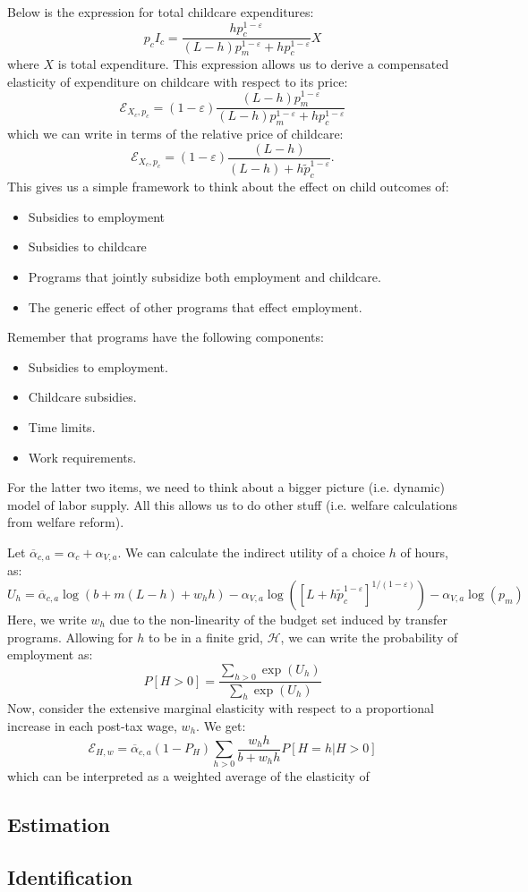 \documentclass[12pt]{article}
\newcommand\ov{\overline}
\newcommand\mc{\mathcal}
\numberwithin{equation}{section}
\numberwithin{figure}{section}
\numberwithin{table}{section}
\begin{document}
Below is the expression for total childcare expenditures:
\[p_cI_c = \frac{h p_c^{1-\varepsilon}}{(L-h)p_m^{1-\varepsilon} + hp_c^{1-\varepsilon}} X \]
where $X$ is total expenditure. This expression allows us to derive a compensated elasticity of expenditure on childcare with respect to its price:
\[\mathcal{E}_{X_c,p_c} = (1-\varepsilon)\frac{(L-h)p_m^{1-\varepsilon}}{(L-h)p_m^{1-\varepsilon} + hp_c^{1-\varepsilon}} \]
which we can write in terms of the relative price of childcare:
\[\mathcal{E}_{X_c,p_c} = (1-\varepsilon)\frac{(L-h)}{(L-h) + h\tilde{p}_c^{1-\varepsilon}}.\]
This gives us a simple framework to think about the effect on child outcomes of:
\begin{itemize}
\item Subsidies to employment
\item Subsidies to childcare
\item Programs that jointly subsidize both employment and childcare.
\item The generic effect of other programs that effect employment.
\end{itemize}
Remember that programs have the following components:
\begin{itemize}
\item Subsidies to employment.
\item Childcare subsidies.
\item Time limits.
\item Work requirements.
\end{itemize}
For the latter two items, we need to think about a bigger picture (i.e. dynamic) model of labor supply. All this allows us to do other stuff (i.e. welfare calculations from welfare reform).

Let $\ov{\alpha}_{c,a} = \alpha_c + \alpha_{V,a}$. We can calculate the indirect utility of a choice $h$ of hours, as:
\[ U_h = \ov{\alpha}_{c,a}\log(b+m(L-h)+w_hh) - \alpha_{V,a}\log\left([L + h\tilde{p}_c^{1-\varepsilon}]^{1/(1-\varepsilon)}\right) - \alpha_{V,a}\log(p_m) \]
Here, we write $w_h$ due to the non-linearity of the budget set induced by transfer programs. Allowing for $h$ to be in a finite grid, $\mc{H}$, we can write the probability of employment as:
\[P[H>0] = \frac{\sum_{h>0}\exp(U_h)}{\sum_h\exp(U_h)} \]
Now, consider the extensive marginal elasticity with respect to a proportional increase in each post-tax wage, $w_h$. We get:
\[\mathcal{E}_{H,w}  = \ov{\alpha}_{c,a}(1-P_H)\sum_{h>0}\frac{w_hh}{b+w_hh}P[H=h|H>0] \]
which can be interpreted as a weighted average of the elasticity of
\subsection{Estimation}


\subsection{Identification}


%
%

\end{document}
